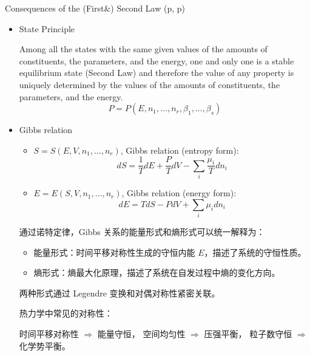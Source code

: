 \begin{thm}\label{cfsl3}
    Consequences of the (First\&) Second Law (p\pageref{cfsl1}\;,\; p\pageref{cfsl2})
\begin{itemize}
    \item State Principle
    
    Among all the states with the same given values of the amounts of constituents, the parameters, 
    and the energy, one and only one is a stable equilibrium state (Second Law) and 
    therefore the value of any property is uniquely determined by the values of 
    the amounts of constituents, the parameters, and the energy.
    \[
    P = P(E, n_1, \ldots, n_r, \beta_1, \ldots, \beta_s)
    \] 
    \item Gibbs relation
    \begin{itemize}
        \item 
        \(
        S = S(E, V, n_1, \dots, n_r)
        \),        
        Gibbs relation (entropy form):
\[
dS = \frac{1}{T} dE + \frac{P}{T} dV - \sum_i \frac{\mu_i}{T} dn_i
\]
        \item 
        \(
        E = E(S, V, n_1, \dots, n_r)
        \),        
        Gibbs relation (energy form):
        \[
        dE = T dS - P dV + \sum_i \mu_i dn_i
        \]
    \end{itemize}
    \begin{add}
        通过诺特定律，Gibbs 关系的能量形式和熵形式可以统一解释为：
\begin{itemize}
    \item 能量形式：时间平移对称性生成的守恒内能 \(E\)，描述了系统的守恒性质。
    \item 熵形式：熵最大化原理，描述了系统在自发过程中熵的变化方向。
\end{itemize}
        两种形式通过 Legendre 变换和对偶对称性紧密关联。
    \begin{zhu}
        热力学中常见的对称性：

    时间平移对称性 $\Rightarrow$ 能量守恒，
    空间均匀性 $\Rightarrow$ 压强平衡，
    粒子数守恒 $\Rightarrow$ 化学势平衡。
    \end{zhu}
    \end{add}
\end{itemize}
\end{thm}
